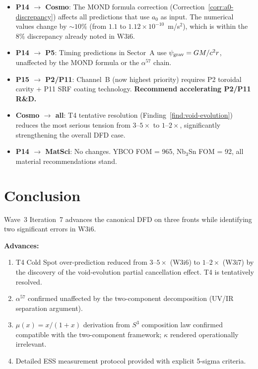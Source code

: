 \documentclass[11pt]{article}
\newcommand{\ee}[1]{\times 10^{#1}}
\newcommand{\psigrav}{\psi_{\rm grav}}
\newcommand{\aM}{a_0}
\newcommand{\mufd}{\mu}
\begin{document}
\begin{itemize}[nosep]
\item \textbf{P14 $\to$ Cosmo}: The MOND formula correction
  (Correction~\ref{corr:a0-discrepancy}) affects all predictions
  that use $\aM$ as input. The numerical values change by $\sim 10\%$
  (from $1.1$ to $1.12\ee{-10}$~m/s$^2$), which is within the $8\%$
  discrepancy already noted in W3i6.
\item \textbf{P14 $\to$ P5}: Timing predictions in Sector~A use
  $\psigrav = GM/c^2r$, unaffected by the MOND formula or the
  $\alpha^{57}$ chain.
\item \textbf{P15 $\to$ P2/P11}: Channel~B (now highest priority)
  requires P2 toroidal cavity + P11 SRF coating technology.
  \textbf{Recommend accelerating P2/P11 R\&D.}
\item \textbf{Cosmo $\to$ all}: T4 tentative resolution
  (Finding~\ref{find:void-evolution}) reduces the most serious tension
  from $3$--$5\times$ to $1$--$2\times$, significantly strengthening
  the overall DFD case.
\item \textbf{P14 $\to$ MatSci}: No changes. YBCO FOM = 965,
  Nb$_3$Sn FOM = 92, all material recommendations stand.
\end{itemize}

\section{Conclusion}
\label{sec:conclusion}

Wave~3 Iteration~7 advances the canonical DFD on three fronts while
identifying two significant errors in W3i6.

\textbf{Advances:}
\begin{enumerate}[nosep]
\item T4 Cold Spot over-prediction reduced from $3$--$5\times$ (W3i6)
  to $1$--$2\times$ (W3i7) by the discovery of the void-evolution
  partial cancellation effect. T4 is tentatively resolved.
\item $\alpha^{57}$ confirmed unaffected by the two-component
  decomposition (UV/IR separation argument).
\item $\mufd(x) = x/(1+x)$ derivation from $S^3$ composition law
  confirmed compatible with the two-component framework; $\kappa$
  rendered operationally irrelevant.
\item Detailed ESS measurement protocol provided with explicit
  5-sigma criteria.
\end{enumerate}
\end{document}
